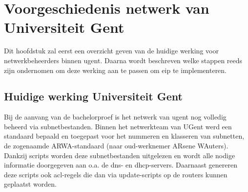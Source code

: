 
\chapter{Voorgeschiedenis netwerk van Universiteit Gent}%
\label{ch:voorgeschiedenis}

Dit hoofdstuk zal eerst een overzicht geven van de huidige werking voor netwerkbeheerders binnen \acrshort{ugent}.
Daarna wordt beschreven welke stappen reeds zijn ondernomen om deze werking aan te passen om \acrlong{eip} te implementeren.

\section{Huidige werking Universiteit Gent}
Bij de aanvang van de bachelorproef is het netwerk van \acrshort{ugent} nog volledig beheerd via subnetbestanden. Binnen het netwerkteam van UGent werd een standaard bepaald en toegepast voor het nummeren en klasseren van subnetten, de zogenaamde ARWA-standaard (naar oud-werknemer ARsene WAuters). Dankzij scripts worden deze subnetbestanden uitgelezen en wordt alle nodige informatie doorgegeven aan o.a. de \acrshort{dns}- en \acrshort{dhcp}-servers. Daarnaast genereren deze scripts ook \acrfull{acl}-regels die dan via update-scripts op de routers kunnen geplaatst worden.

